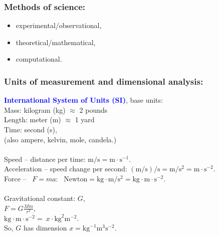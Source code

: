 \documentclass[aspectratio=169,xcolor=pdftex,dvipsnames]{beamer} %
\newcommand{\jemph}[1]{\textcolor{Blue}{\textbf{#1}}}
\begin{document}

\begin{frame}
\frametitle{Methods of science: }

\begin{itemize}
\item
experimental/observational, 
\item
theoretical/mathematical, 
\item
computational.
\end{itemize}

\end{frame}


\begin{frame}
\frametitle{Units of measurement and dimensional analysis:}

\jemph{International System of Units (SI)}, base units:\\
Mass: kilogram (kg)  $\approx$ 2 pounds\\
Length: meter (m) $\approx$ 1 yard\\
Time: second (s),\\
(also ampere, kelvin, mole, candela.)
\\ \ \\
Speed -- distance per time:  $\text{m}/\text{s}=\text{m}\cdot \text{s}^{-1}$.\\
Acceleration -- speed change per second: 
$(\text{m}/\text{s})/\text{s} = \text{m}/\text{s}^2=\text{m}\cdot \text{s}^{-2}$.\\
Force -- \  $F = ma$: \ $\text{Newton} = \text{kg}\cdot \text{m}/\text{s}^2 =  \text{kg}\cdot \text{m}\cdot\text{s}^{-2}$.
\\ \ \\
Gravitational constant: $G$,\\
$F = G \frac{Mm}{r^2}$, \\
$\text{kg}\cdot \text{m}\cdot\text{s}^{-2} = \ x\cdot\text{kg}^2\text{m}^{-2}$.\\
So, $G$ has dimension $x = \text{kg}^{-1}\text{m}^3\text{s}^{-2}$.

\end{frame}
\end{document}
